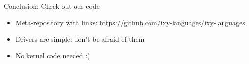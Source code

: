 \documentclass[NET,english,aspectratio=169,notitleframe]{tumbeamer}
\begin{document}
%
%


\begin{frame}{Conclusion: Check out our code}
\centering {}
\begin{itemize}
\item Meta-repository with links: \url{https://github.com/ixy-languages/ixy-languages}
\item Drivers are simple: don't be afraid of them
\item No kernel code needed :)
\end{itemize}
\end{frame}
\end{document}
